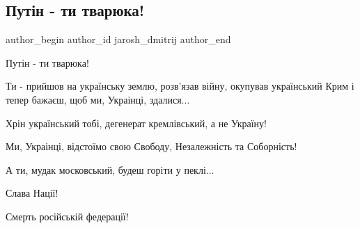  
 
 
 
 
 
\subsection{Путін - ти тварюка!}
\label{sec:09_12_2021.fb.jarosh_dmitrij.1.putin_ty_tvarjuka}
 
\ifcmt
 author_begin
   author_id jarosh_dmitrij
 author_end
\fi

Путін - ти тварюка! 

Ти - прийшов на українську землю, розв’язав війну, окупував український Крим і
тепер бажаєш, щоб ми, Украінці, здалися... 

Хрін український тобі, дегенерат кремлівський, а не Україну!

Ми, Украінці, відстоїмо свою Свободу, Незалежність та Соборність! 

А ти, мудак московський, будеш горіти у пеклі...

Слава Нації! 

Смерть російській федерації!

